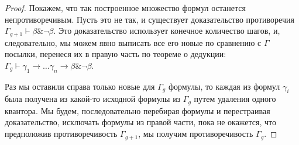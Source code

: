 \documentclass[a4paper,11pt]{article}
\theoremstyle{definition}
\newcommand{\proves}{\vdash}
\newcommand{\amp}{\mathbin{\&}}
\begin{document}
\begin{proof}
Покажем, что так построенное множество формул останется непротиворечивым. Пусть
это не так, и существует доказательство противоречия $\Gamma_{g+1} \proves \beta
\amp \neg\beta$. Это доказательство использует конечное количество шагов, и,
следовательно, мы можем явно выписать все его новые по сравнению с $\Gamma$
посылки, перенеся их в правую часть по теореме о дедукции: $\Gamma_g \proves
\gamma_1 \to \dots \gamma_n \to \beta \amp \neg\beta$.

Раз мы оставили справа только новые для $\Gamma_g$ формулы, то каждая из формул
$\gamma_i$ была получена из какой-то исходной формулы из $\Gamma_g$ путем
удаления одного квантора. Мы будем, последовательно перебирая формулы и
перестраивая доказательство, исключать формулы из правой части, пока не окажется,
что предположив противоречивость $\Gamma_{g+1}$, мы получим противоречивость
$\Gamma_g$.


\end{proof}
\end{document}
